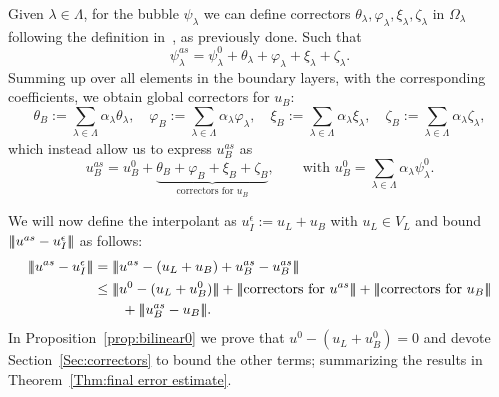 \documentclass{article}
\newcommand{\vvvert}{\ensuremath|\!|\!|\xspace}
\newcommand{\T}{\ensuremath{\mathcal{T}}\xspace}
\newcommand{\ueps}{u^\epsilon}
\newcommand{\uas}{u^{as}}
\newcommand{\uBas}{\ensuremath{u_B^{as}}\xspace}
\newcommand{\psilambda}{\ensuremath{\psi_{\lambda}}}
\newcommand{\psilambdaas}{\ensuremath{\psi_{\lambda}^{as}}}
\newcommand{\summLA}[1][{}]{\ensuremath{\sum_{\lambda\in\Lambda_{#1}}\alpha_\lambda}}
\begin{document}
Given $\lambda\in\Lambda$, for the bubble $\psilambda$ we can define correctors $\theta_{\lambda},\varphi_{\lambda},\xi_{\lambda},\zeta_{\lambda}$ in $\Omega_\lambda$ following the definition in~\cite{GieEtAl:13}, as previously done. Such that
\[\psilambdaas =\psi_\lambda^0 + \theta_{\lambda}+\varphi_{\lambda}+\xi_{\lambda}+\zeta_{\lambda}. \]  Summing up over all elements in the boundary layers, with the corresponding coefficients, we obtain global correctors for $u_B$:
\begin{equation}\label{eq:defBubbCorr}
    \theta_B := \summLA \theta_\lambda,
    \quad
    \varphi_B := \summLA \varphi_\lambda,
    \quad
    \xi_B := \summLA \xi_\lambda,
    \quad
    \zeta_B := \summLA \zeta_\lambda,
\end{equation}
which instead allow us to express \uBas as
\begin{equation}\label{def:uB_ass}
\uBas = u_B^0 + \underbrace{\theta_B+ \varphi_B +\xi_B + \zeta_B}_{\text{correctors for }u_B},
\qquad\text{with } u_B^0  = \summLA \psi_\lambda^0.
\end{equation}

We will now define the interpolant as $\ueps_I:=u_L + u_B$ with $u_L \in V_L$ and bound $\vvvert  \uas - \ueps_I\vvvert $ as follows:
\begin{align*}
\vvvert  \uas - \ueps_I\vvvert &=  \vvvert \uas - (u_L + u_B) +\uBas - \uBas\vvvert  \\
       & \leq \vvvert u^0 - (u_L + u_B^0)\vvvert   + \vvvert \text{correctors for }\uas\vvvert  + \vvvert \text{correctors for }u_B\vvvert  \\
       &\qquad + \vvvert u_B^{as} - u_B\vvvert .
\end{align*}
In Proposition~\ref{prop:bilinear0} we prove that $u^0 - (u_L + u_B^0) = 0$ and devote Section~\ref{Sec:correctors} to bound the other terms; summarizing the results in Theorem~\ref{Thm:final error estimate}.


\end{document}
